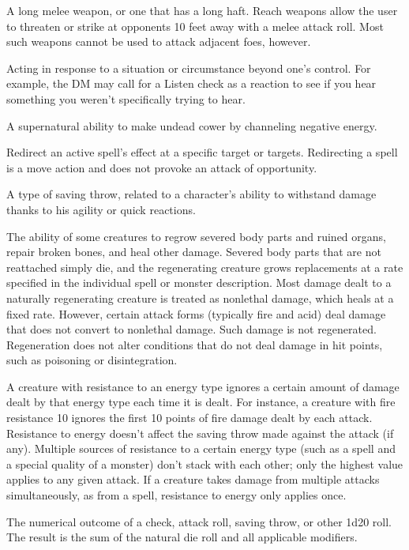  A long melee weapon, or one that has a long haft. 
Reach weapons allow the user to threaten or strike at opponents 10 
feet away with a melee attack roll. Most such weapons cannot be 
used to attack adjacent foes, however. 

 Acting in response to a situation or circumstance 
beyond one's control. For example, the DM may call for a Listen 
check as a reaction to see if you hear something you weren't 
specifically trying to hear. 

 A supernatural ability to make undead cower by 
channeling negative energy. 

 Redirect an active spell's effect at a specific 
target or targets. Redirecting a spell is a move action and does not 
provoke an attack of opportunity. 

 A type of saving throw, related to a character's ability 
to withstand damage thanks to his agility or quick reactions. 

 The ability of some creatures to regrow severed 
body parts and ruined organs, repair broken bones, and heal other 
damage. Severed body parts that are not reattached simply die, and 
the regenerating creature grows replacements at a rate specified in 
the individual spell or monster description. Most damage dealt to a 
naturally regenerating creature is treated as nonlethal damage, 
which heals at a fixed rate. However, certain attack forms (typically 
fire and acid) deal damage that does not convert to nonlethal 
damage. Such damage is not regenerated. Regeneration does not 
alter conditions that do not deal damage in hit points, such as 
poisoning or disintegration. 

 A creature with resistance to an energy 
type ignores a certain amount of damage dealt by that energy type 
each time it is dealt. For instance, a creature with fire resistance 10 
ignores the first 10 points of fire damage dealt by each attack. 
Resistance to energy doesn't affect the saving throw made against 
the attack (if any). Multiple sources of resistance to a certain energy 
type (such as a spell and a special quality of a monster) don't stack 
with each other; only the highest value applies to any given attack. If a creature takes damage from multiple attacks simultaneously, as from a  spell, resistance to energy only applies once.

 The numerical outcome of a check, attack roll, saving 
throw, or other 1d20 roll. The result is the sum of the natural die roll 
and all applicable modifiers. 

